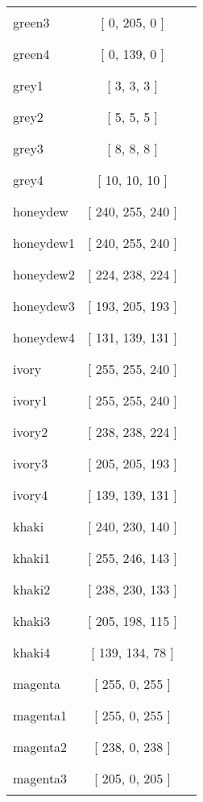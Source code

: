 \begin{tabular}{|l|c|c|}
green3 & [ 0, 205, 0 ] & \color{green3} \rule{1cm}{1.5ex}\\
green4 & [ 0, 139, 0 ] & \color{green4} \rule{1cm}{1.5ex}\\
grey1 & [ 3, 3, 3 ] & \color{grey1} \rule{1cm}{1.5ex}\\
grey2 & [ 5, 5, 5 ] & \color{grey2} \rule{1cm}{1.5ex}\\
grey3 & [ 8, 8, 8 ] & \color{grey3} \rule{1cm}{1.5ex}\\
grey4 & [ 10, 10, 10 ] & \color{grey4} \rule{1cm}{1.5ex}\\
honeydew & [ 240, 255, 240 ] & \color{honeydew} \rule{1cm}{1.5ex}\\
honeydew1 & [ 240, 255, 240 ] & \color{honeydew1} \rule{1cm}{1.5ex}\\
honeydew2 & [ 224, 238, 224 ] & \color{honeydew2} \rule{1cm}{1.5ex}\\
honeydew3 & [ 193, 205, 193 ] & \color{honeydew3} \rule{1cm}{1.5ex}\\
honeydew4 & [ 131, 139, 131 ] & \color{honeydew4} \rule{1cm}{1.5ex}\\
ivory & [ 255, 255, 240 ] & \color{ivory} \rule{1cm}{1.5ex}\\
ivory1 & [ 255, 255, 240 ] & \color{ivory1} \rule{1cm}{1.5ex}\\
ivory2 & [ 238, 238, 224 ] & \color{ivory2} \rule{1cm}{1.5ex}\\
ivory3 & [ 205, 205, 193 ] & \color{ivory3} \rule{1cm}{1.5ex}\\
ivory4 & [ 139, 139, 131 ] & \color{ivory4} \rule{1cm}{1.5ex}\\
khaki & [ 240, 230, 140 ] & \color{khaki} \rule{1cm}{1.5ex}\\
khaki1 & [ 255, 246, 143 ] & \color{khaki1} \rule{1cm}{1.5ex}\\
khaki2 & [ 238, 230, 133 ] & \color{khaki2} \rule{1cm}{1.5ex}\\
khaki3 & [ 205, 198, 115 ] & \color{khaki3} \rule{1cm}{1.5ex}\\
khaki4 & [ 139, 134, 78 ] & \color{khaki4} \rule{1cm}{1.5ex}\\
magenta & [ 255, 0, 255 ] & \color{magenta} \rule{1cm}{1.5ex}\\
magenta1 & [ 255, 0, 255 ] & \color{magenta1} \rule{1cm}{1.5ex}\\
magenta2 & [ 238, 0, 238 ] & \color{magenta2} \rule{1cm}{1.5ex}\\
magenta3 & [ 205, 0, 205 ] & \color{magenta3} \rule{1cm}{1.5ex}\\

\end{tabular}
